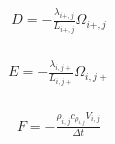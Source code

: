 \documentclass[a4paper,12pt,russian]{extreport}
\begin{document}
\begin{eqnarray}
\begin{gathered}
\label{eq:D_coeff}
D = - \frac{\lambda_{i+,j}}{L_{i+,j}} \Omega_{i+,j}
\end{gathered}
\end{eqnarray}

\begin{eqnarray}
\begin{gathered}
\label{eq:E_coeff}
E = - \frac{\lambda_{i,j+}}{L_{i,j+}} \Omega_{i,j+}
\end{gathered}
\end{eqnarray}

\begin{eqnarray}
\begin{gathered}
\label{eq:F_coeff}
F = - \frac{\rho_{i,j} c_{\rho_{i,j}} V_{i,j}}{\Delta t}
\end{gathered}
\end{eqnarray}
\end{document}
